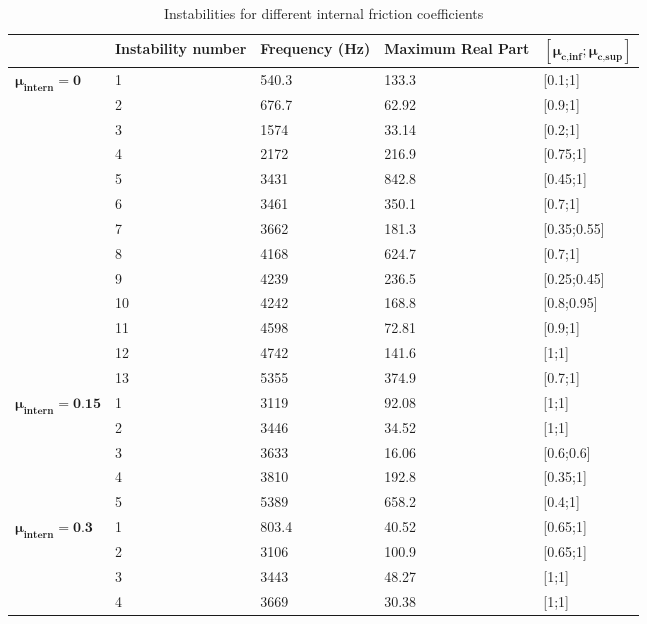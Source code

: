 \documentclass[final,1p]{elsarticle}
\begin{document}
\begin{table}[h!]
\centering
\caption{Instabilities for different internal friction coefficients}
\begin{tabularx}{\hsize}{YYYYY}
\toprule
			   &  \textbf{Instability number } & \textbf{Frequency (Hz)}    & \textbf{Maximum Real Part}     & $\left[\boldsymbol{\mu}_{\textbf{c,inf}};\boldsymbol{\mu}_{\textbf{c,sup}}\right] $ 	  \\
\midrule
{} 	
											& 1		& 540.3		&133.3		& [0.1;1]			\\
											& 2		&676.7		& 62.92		& [0.9;1]			\\
											& 3		&1574		&33.14		& [0.2;1]			\\
											& 4		& 2172		& 216.9		& [0.75;1]			\\
											& 5		& 3431		& 842.8		& [0.45;1]			\\
											& 6		& 3461		& 350.1		& [0.7;1]			\\
											& 7		& 3662		& 181.3		& [0.35;0.55]		\\
											& 8		& 4168		& 624.7		& [0.7;1]			\\
											& 9		& 4239		& 236.5		& [0.25;0.45]		\\
											& 10		& 4242		& 168.8		& [0.8;0.95]		\\
											& 11		& 4598		& 72.81		& [0.9;1]			\\
											& 12		& 4742		& 141.6		& [1;1]				\\
											& 13		& 5355		& 374.9		& [0.7;1]			\\
\midrule
{} 
											& 1		& 3119		& 92.08		& [1;1]			\\
											& 2		& 3446		& 34.52		& [1;1]			\\
											& 3		& 3633		& 16.06		& [0.6;0.6]		\\
											& 4		& 3810		& 192.8		& [0.35;1]		\\
											& 5		& 5389		& 658.2		& [0.4;1]		\\
\midrule
{} 
											& 1		& 803.4		& 40.52		& [0.65;1]	 	\\
											& 2		& 3106		& 100.9		& [0.65;1]	 	\\
											& 3		& 3443		& 48.27		& [1;1]	 		\\
											& 4		& 3669		& 30.38		& [1;1]			 \\

\end{tabularx}
\end{table}
\end{document}
